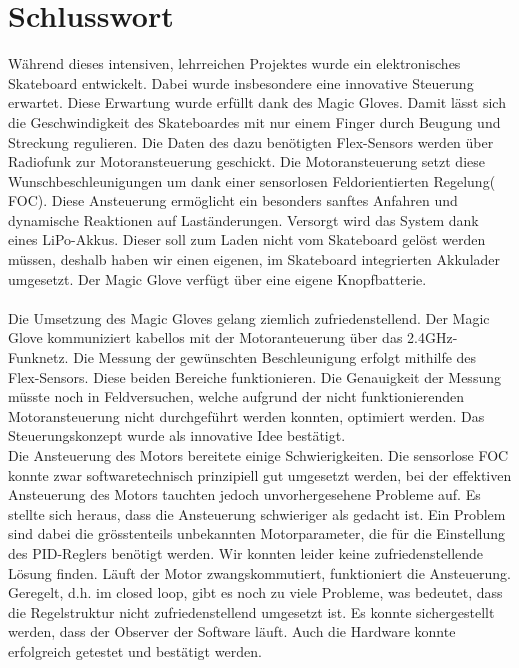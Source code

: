 \chapter{Schlusswort}

Während dieses intensiven, lehrreichen Projektes wurde ein elektronisches Skateboard entwickelt. Dabei wurde insbesondere eine innovative Steuerung erwartet. Diese Erwartung wurde erfüllt dank des Magic Gloves. Damit lässt sich die Geschwindigkeit des Skateboardes mit nur einem Finger durch Beugung und Streckung regulieren. Die Daten des dazu benötigten Flex-Sensors werden über Radiofunk zur Motoransteuerung geschickt. Die Motoransteuerung setzt diese Wunschbeschleunigungen um dank einer sensorlosen Feldorientierten Regelung( FOC). Diese Ansteuerung ermöglicht ein besonders sanftes Anfahren und dynamische Reaktionen auf Laständerungen. Versorgt wird das System dank eines LiPo-Akkus. Dieser soll zum Laden nicht vom Skateboard gelöst werden müssen, deshalb haben wir einen eigenen, im Skateboard integrierten Akkulader umgesetzt. Der Magic Glove verfügt über eine eigene Knopfbatterie.\\
\\
Die Umsetzung des Magic Gloves gelang ziemlich zufriedenstellend. Der Magic Glove kommuniziert kabellos mit der Motoranteuerung über das 2.4GHz-Funknetz. Die Messung der gewünschten Beschleunigung erfolgt mithilfe des Flex-Sensors. Diese beiden Bereiche funktionieren. Die Genauigkeit der Messung müsste noch in Feldversuchen, welche aufgrund der nicht funktionierenden Motoransteuerung nicht durchgeführt werden konnten, optimiert werden. Das Steuerungskonzept wurde als innovative Idee bestätigt. \\
Die Ansteuerung des Motors bereitete einige Schwierigkeiten. Die sensorlose FOC konnte zwar softwaretechnisch prinzipiell gut umgesetzt werden, bei der effektiven Ansteuerung des Motors tauchten jedoch unvorhergesehene Probleme auf. Es stellte sich heraus, dass die Ansteuerung schwieriger als gedacht ist. Ein Problem sind dabei die grösstenteils unbekannten Motorparameter, die für die Einstellung des PID-Reglers benötigt werden. Wir konnten leider keine zufriedenstellende Lösung finden. Läuft der Motor zwangskommutiert, funktioniert die Ansteuerung. Geregelt, d.h. im closed loop, gibt es noch zu viele Probleme, was bedeutet, dass die Regelstruktur nicht zufriedenstellend umgesetzt ist. Es konnte sichergestellt werden, dass der Observer der Software läuft. Auch die Hardware konnte erfolgreich getestet und bestätigt werden. \\
